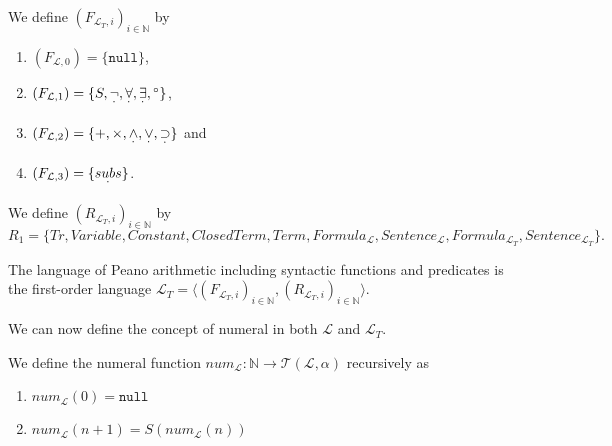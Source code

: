 \begin{definition}\label{def:L_T-Func}
  \leanok
  We define $(F_{\mathcal{L}_T,i})_{i \in \mathbb{N}}$ by
  \begin{enumerate}
  \item $(F_{\mathcal{L},0}) = \{\texttt{null}\}$,
  \item $(F_{\mathcal{L},1}) = \{S, \underset{^{\boldsymbol{\cdot}}}{\neg} , \underset{^{\boldsymbol{\cdot}}}{\forall}, \underset{^{\boldsymbol{\cdot}}}{\exists}, {^\circ}\}$,
  \item $(F_{\mathcal{L},2}) = \{+,\times, \underset{^{\boldsymbol{\cdot}}}{\wedge}, \underset{^{\boldsymbol{\cdot}}}{\vee}, \underset{^{\boldsymbol{\cdot}}}{\supset}\}$ and
  \item $(F_{\mathcal{L},3}) = \{\underset{^{\boldsymbol{\cdot}}}{subs}\}$.
  \end{enumerate}
\end{definition}

\begin{definition}\label{def:L_T-Rel}
  \leanok
  We define $(R_{\mathcal{L}_T,i})_{i \in \mathbb{N}}$ by \[R_1 = \{Tr,Variable, Constant, ClosedTerm, Term, Formula_{\mathcal{L}}, Sentence_{\mathcal{L}}, Formula_{\mathcal{L}_T}, Sentence_{\mathcal{L}_T}\}.\]
\end{definition}

\begin{definition}\label{def:L_T}
  \leanok
    The language of Peano arithmetic including syntactic functions and predicates is the first-order language $\mathcal{L}_T = \langle (F_{\mathcal{L}_T,i})_{i \in \mathbb{N}}, (R_{\mathcal{L}_T,i})_{i \in \mathbb{N}} \rangle$.
\end{definition}

We can now define the concept of numeral in both $\mathcal{L}$ and $\mathcal{L}_T$.
\begin{definition}\label{def:L-Numeral}
  \leanok
  We define the numeral function $num_{\mathcal{L}} : \mathbb{N} \to \mathcal{T}(\mathcal{L},\alpha)$ recursively as
  \begin{enumerate}
  \item $num_{\mathcal{L}}(0) = \texttt{null}$
  \item $num_{\mathcal{L}}(n + 1) = S(num_{\mathcal{L}}(n))$
  \end{enumerate}
\end{definition}


